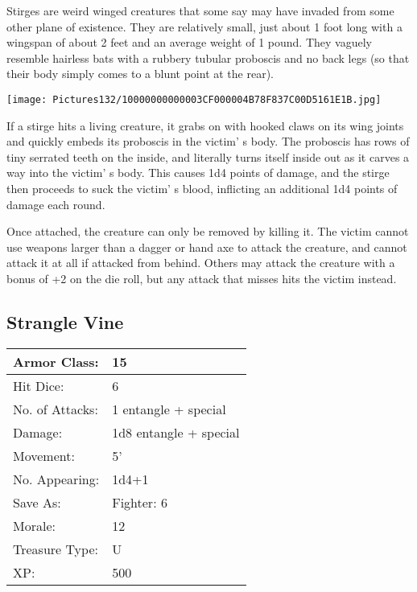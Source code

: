\documentclass[a4paper,twoside,openany,10pt]{book}
\begin{document}
\begin{multicols}{2}
Stirges are weird winged creatures that some say may have invaded from some other plane of existence. They are relatively small, just about 1 foot long with a wingspan of about 2 feet and an average weight of 1 pound. They vaguely resemble hairless bats with a rubbery tubular proboscis and no back legs (so that their body simply comes to a blunt point at the rear).


\begin{center} \texttt{[image: Pictures132/10000000000003CF000004B78F837C00D5161E1B.jpg]} \end{center}

If a stirge hits a living creature, it grabs on with hooked claws on its wing joints and quickly embeds its proboscis in the victim' s body. The proboscis has rows of tiny serrated teeth on the inside, and literally turns itself inside out as it carves a way into the victim' s body. This causes 1d4 points of damage, and the stirge then proceeds to suck the victim' s blood, inflicting an additional 1d4 points of damage each round.

Once attached, the creature can only be removed by killing it. The victim cannot use weapons larger than a dagger or hand axe to attack the creature, and cannot attack it at all if attacked from behind. Others may attack the creature with a bonus of +2 on the die roll, but any attack that misses hits the victim instead.

\subsection*{Strangle Vine}\label{strangle-vine}

\begin{tabularx}{0.50\textwidth}{@{}lX@{}}
Armor Class: & 15 \\\hline
Hit Dice: & 6 \\\hline
No. of Attacks: & 1 entangle + special \\\hline
Damage: & 1d8 entangle + special \\\hline
Movement: & 5' \\\hline
No. Appearing: & 1d4+1 \\\hline
Save As: & Fighter: 6 \\\hline
Morale: & 12 \\\hline
Treasure Type: & U \\\hline
XP: & 500 \\\hline
\end{tabularx}\medskip


\end{multicols}
\end{document}
